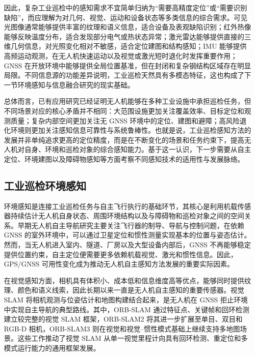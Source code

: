 因此，复杂工业巡检中的感知需求不宜简单归纳为“需要高精度定位”或“需要识别缺陷”，而应理解为对几何、视觉、运动和设备状态等多类信息的综合需求。可见光图像通常能够提供丰富的纹理和语义信息，适合设备及表观缺陷识别；红外热像能够反映温度分布，适合发现部分电气或热状态异常\cite{jadin2012recent,usamentiaga2014infrared}；激光雷达能够提供直接的三维几何信息，对光照变化相对不敏感，适合定位建图和结构感知\cite{zhang2014loam,wujq2021review}；IMU 能够提供高频运动观测，在无人机快速运动以及视觉或激光短时退化时发挥重要作用；GNSS 在开放环境中能够提供全局位置基准，但在封闭和复杂钢结构区域存在明显局限。不同信息源的功能差异说明，工业巡检天然具有多模态特征，这也构成了下一节环境感知与信息融合研究的现实基础。

总体而言，已有应用研究已经证明无人机能够在多种工业设施中承担巡检任务，但不同场景对应的核心矛盾并不相同：大范围设施更加关注覆盖效率、目标定位和观测质量；复杂内部空间更加关注无 GNSS 环境中的定位、建图和避障；高风险退化环境则更加关注感知信息可靠性与系统鲁棒性。也就是说，工业巡检感知方法的发展并非单纯追求更高的定位精度，而是在不断变化的场景和任务约束下，提高无人机对自身、环境和巡检对象的综合感知能力。基于这一认识，下一步需要从自主定位、环境建图以及障碍物感知等方面考察不同感知技术的适用性与发展脉络。

\subsection{工业巡检环境感知}

环境感知是连接工业巡检任务与自主飞行执行的基础环节，其核心是利用机载传感器持续估计无人机自身状态、周围环境结构以及与障碍物和巡检对象之间的空间关系。早期无人机自主导航研究主要关注飞行器的制导、导航与控制问题，在依赖 GNSS 的室外环境中，可以通过卫星定位和惯性测量实现基本的位置与姿态估计\cite{kendoul2012survey,cai2014survey}。然而，当无人机进入室内、隧道、厂房以及大型设备内部后，GNSS 不再能够稳定提供位置约束，自主定位便需要更多依赖机载视觉、激光和惯性信息\cite{nil2012review,scaramuzza2014vision}。因此，GPS/GNSS 可用性变化成为推动无人机自主感知方法发展的重要实际因素。

在视觉感知方面，相机具有体积小、成本低和信息维度高等优点，能够同时提供纹理、颜色和语义线索，因此长期以来一直是无人机自主感知的重要传感器。视觉 SLAM 将相机观测与位姿估计和地图构建结合起来，是无人机在 GNSS 拒止环境中实现自主导航的典型路线\cite{durrant2006simultaneous,cadena2016past,scaramuzza2014vision}。其中，ORB-SLAM 通过特征点、关键帧和回环检测建立较完整的视觉 SLAM 框架\cite{mur2015orb}，ORB-SLAM2 将其进一步扩展至单目、双目和 RGB-D 相机，ORB-SLAM3 则在视觉和视觉--惯性模式基础上继续支持多地图场景\cite{mur2017orb,campos2021orb}。这些工作推动了视觉 SLAM 从单一视觉里程计向具有回环检测、重定位和多模式运行能力的通用框架发展。

